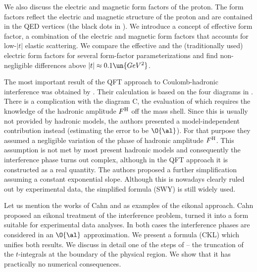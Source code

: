 
We also discuss the electric and magnetic form factors of the proton. The form factors reflect the electric and magnetic structure of the proton and are contained in the QED vertices (the black dots in ). We introduce a concept of effective form factor, a combination of the electric and magnetic form factors that accounts for low-$|t|$ elastic scattering. We compare the effective and the (traditionally used) electric form factors for several form-factor parameterizations and find non-negligible differences above $|t| \approx 0.1\un{GeV^2}$.

The most important result of the QFT approach to Coulomb-hadronic interference was obtained by \WaY{} . Their calculation is based on the four diagrams in . There is a complication with the diagram C, the evaluation of which requires the knowledge of the hadronic amplitude $F^{\rm H}$ off the mass shell. Since this is usually not provided by hadronic models, the authors presented a model-independent contribution instead (estimating the error to be $\O{\al}$). For that purpose they assumed a negligible variation of the phase of hadronic amplitude $F^{\rm H}$. This assumption is not met by most present hadronic models and consequently the interference phase turns out complex, although in the QFT approach it is constructed as a real quantity. The authors proposed a further simplification assuming a constant exponential slope. Although this is nowadays clearly ruled out by experimental data, the simplified \WY{} formula (SWY) is still widely used.

Let us mention the works of Cahn  and \KaL{}  as examples of the eikonal approach. Cahn proposed an eikonal treatment of the interference problem, \KaL{} turned it into a form suitable for experimental data analyses. In both cases the interference phases are considered in an $\O{\al}$ approximation. We present a formula (CKL) which unifies both results. We discuss in detail one of the steps of \KaL{} -- the truncation of the $t$-integrals at the boundary of the physical region. We show that it has practically no numerical consequences.

